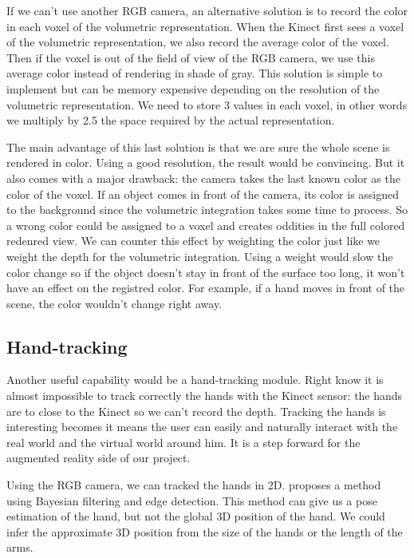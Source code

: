 \documentclass[12pt]{article}
\begin{document}
If we can't use another RGB camera, an alternative solution is to record the color in each voxel of the volumetric representation. When the Kinect first sees a voxel of the volumetric representation, we also record the average color of the voxel. Then if the voxel is out of the field of view of the RGB camera, we use this average color instead of rendering in shade of gray. This solution is simple to implement but can be memory expensive depending on the resolution of the volumetric representation. We need to store 3 values in each voxel, in other words we multiply by 2.5 the space required by the actual representation.

The main advantage of this last solution is that we are sure the whole scene is rendered in color. Using a good resolution, the result would be convincing. But it also comes with a major drawback: the camera takes the last known color as the color of the voxel. If an object comes in front of the camera, its color is assigned to the background since the volumetric integration takes some time to process. So a wrong color could be assigned to a voxel and creates oddities in the full colored redenred view. We can counter this effect by weighting the color just like we weight the depth for the volumetric integration. Using a weight would slow the color change so if the object doesn't stay in front of the surface too long, it won't have an effect on the registred color. For example, if a hand moves in front of the scene, the color wouldn't change right away.

\subsection{Hand-tracking}
Another useful capability would be a hand-tracking module. Right know it is almost impossible to track correctly the hands with the Kinect sensor: the hands are to close to the Kinect so we can't record the depth. Tracking the hands is interesting becomes it means the user can easily and naturally interact with the real world and the virtual world around him. It is a step forward for the augmented reality side of our project.

Using the RGB camera, we can tracked the hands in 2D. \cite{Hand2D} proposes a method using Bayesian filtering and edge detection. This method can give us a pose estimation of the hand, but not the global 3D position of the hand. We could infer the approximate 3D position from the size of the hands or the length of the arms.
\end{document}
